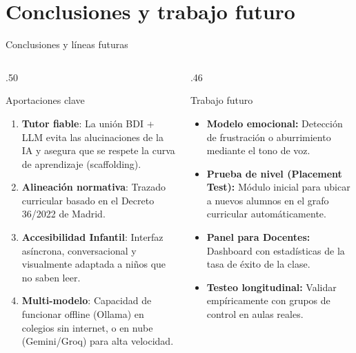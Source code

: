 \documentclass[aspectratio=169, 10pt]{beamer}
\begin{document}
\section{Conclusiones y trabajo futuro}

\begin{frame}{Conclusiones y líneas futuras}
  \begin{columns}[T]
    \begin{column}{.50\textwidth}
      \begin{block}{Aportaciones clave}
        \small
        \begin{enumerate}
          \item \textbf{Tutor fiable}: La unión BDI + LLM evita las alucinaciones de la IA y asegura que se respete la curva de aprendizaje (scaffolding).
          \item \textbf{Alineación normativa}: Trazado curricular basado en el Decreto 36/2022 de Madrid.
          \item \textbf{Accesibilidad Infantil}: Interfaz asíncrona, conversacional y visualmente adaptada a niños que no saben leer.
          \item \textbf{Multi-modelo}: Capacidad de funcionar offline (Ollama) en colegios sin internet, o en nube (Gemini/Groq) para alta velocidad.
        \end{enumerate}
      \end{block}
    \end{column}
    \begin{column}{.46\textwidth}
      \begin{block}{Trabajo futuro}
        \small
        \begin{itemize}
          \item \textbf{Modelo emocional:} Detección de frustración o aburrimiento mediante el tono de voz.
          \item \textbf{Prueba de nivel (Placement Test):} Módulo inicial para ubicar a nuevos alumnos en el grafo curricular automáticamente.
          \item \textbf{Panel para Docentes:} Dashboard con estadísticas de la tasa de éxito de la clase.
          \item \textbf{Testeo longitudinal:} Validar empíricamente con grupos de control en aulas reales.
        \end{itemize}
      \end{block}
    \end{column}
  \end{columns}
\end{frame}
\end{document}
